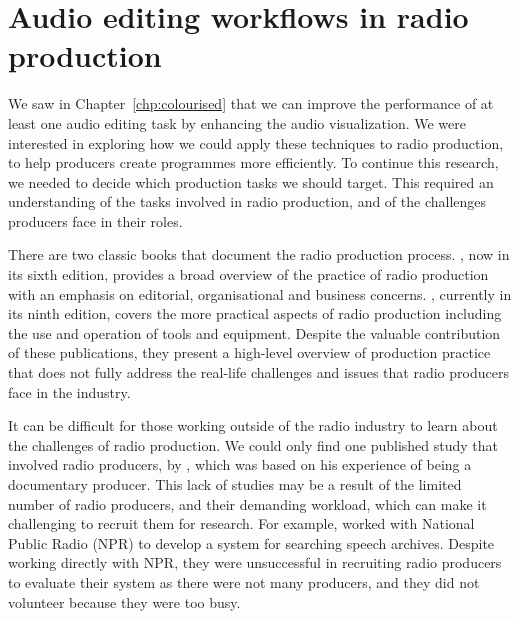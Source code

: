 \chapter{Audio editing workflows in radio production}\label{chp:ethno}



We saw in Chapter~\ref{chp:colourised} that we can improve the performance of at least one audio editing task by
enhancing the audio visualization. We were interested in exploring how we could apply these techniques to radio
production, to help producers create programmes more efficiently.  To continue this research, we needed to decide which
production tasks we should target. This required an understanding of the tasks involved in radio production, and of the
challenges producers face in their roles.



There are two classic books that document the radio production process. \citet{McLeish2015}, now in its sixth edition,
provides a broad overview of the practice of radio production with an emphasis on editorial, organisational and
business concerns.  \citet{Hausman2012}, currently in its ninth edition, covers the more practical aspects of radio
production including the use and operation of tools and equipment.  Despite the valuable contribution of these
publications, they present a high-level overview of production practice that does not fully address the real-life
challenges and issues that radio producers face in the industry.

It can be difficult for those working outside of the radio industry to learn about the challenges of radio production.
We could only find one published study that involved radio producers, by \citet{Dunaway2000}, which was based on his
experience of being a documentary producer. This lack of studies may be a result of the limited number of radio
producers, and their demanding workload, which can make it challenging to recruit them for research.  For example,
\citet{Kim2003} worked with National Public Radio (NPR) to develop a system for searching speech archives.  Despite
working directly with NPR, they were unsuccessful in recruiting radio producers to evaluate their system as there were
not many producers, and they did not volunteer because they were too busy.

